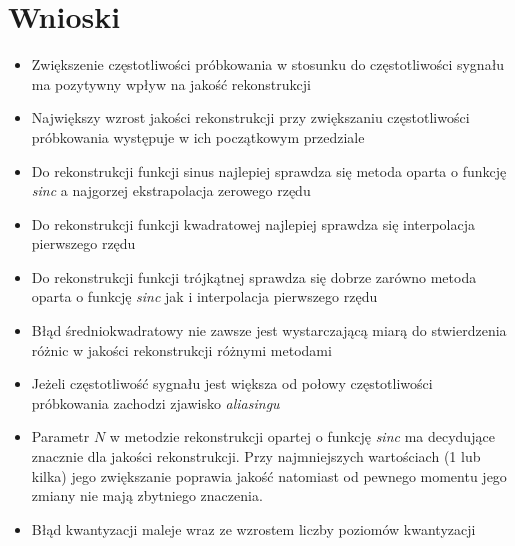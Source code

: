 \documentclass[12pt]{article}
\begin{document}
        \section{Wnioski} {

        \begin{itemize}
        \item Zwiększenie częstotliwości próbkowania w stosunku do częstotliwości sygnału ma
        pozytywny wpływ na jakość rekonstrukcji
        \item Największy wzrost jakości rekonstrukcji przy zwiększaniu częstotliwości
        próbkowania występuje w ich początkowym przedziale
        \item Do rekonstrukcji funkcji sinus najlepiej sprawdza się metoda oparta o funkcję
        \emph{sinc} a najgorzej ekstrapolacja zerowego rzędu
        \item Do rekonstrukcji funkcji kwadratowej najlepiej sprawdza się interpolacja
        pierwszego rzędu
        \item Do rekonstrukcji funkcji trójkątnej sprawdza się dobrze zarówno metoda oparta o
        funkcję \emph{sinc} jak i interpolacja pierwszego rzędu
        \item Błąd średniokwadratowy nie zawsze jest wystarczającą miarą do stwierdzenia różnic
        w jakości rekonstrukcji różnymi metodami
        \item Jeżeli częstotliwość sygnału jest większa od połowy częstotliwości próbkowania
        zachodzi zjawisko \emph{aliasingu}
        \item Parametr $N$ w metodzie rekonstrukcji opartej o funkcję \emph{sinc} ma decydujące
        znacznie dla jakości rekonstrukcji. Przy najmniejszych wartościach (1 lub kilka)
        jego zwiększanie poprawia jakość natomiast od pewnego momentu jego zmiany nie mają
        zbytniego znaczenia.
        \item Błąd kwantyzacji maleje wraz ze wzrostem
        liczby poziomów kwantyzacji
        \end{itemize}
        }
\renewcommand\refname{Bibliografia}


\end{document}
